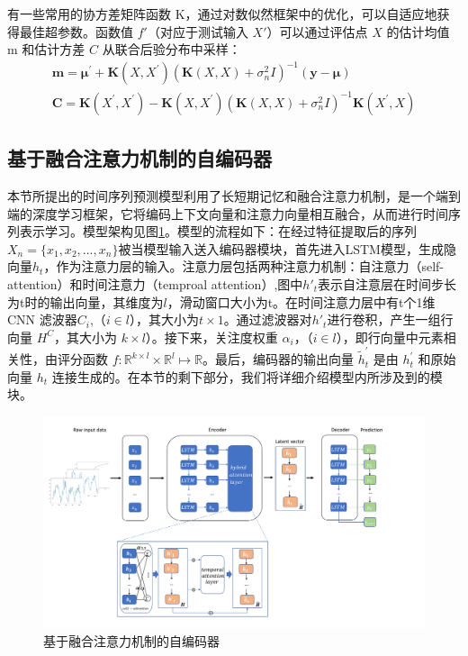 有一些常用的协方差矩阵函数 K，通过对数似然框架中的优化，可以自适应地获得最佳超参数。函数值 $f'$（对应于测试输入 $X'$）可以通过评估点 $X$ 的估计均值 m 和估计方差 $C$ 从联合后验分布中采样：
\begin{equation}
\begin{array}{c}
\boldsymbol{m}=\boldsymbol{\mu}^{\prime}+\boldsymbol{K}\left(X, X^{\prime}\right)\left(\boldsymbol{K}(X, X)+\sigma_{n}^{2} I\right)^{-1}(\boldsymbol{y}-\boldsymbol{\mu}) \\
\boldsymbol{C}=\boldsymbol{K}\left(X^{\prime}, X^{\prime}\right)-\boldsymbol{K}\left(X, X^{\prime}\right)\left(\boldsymbol{K}(X, X)+\sigma_{n}^{2} I\right)^{-1} \boldsymbol{K}\left(X^{\prime}, X\right)
\end{array}
\end{equation}

\subsection{基于融合注意力机制的自编码器}
本节所提出的时间序列预测模型利用了长短期记忆和融合注意力机制，是一个端到端的深度学习框架，它将编码上下文向量和注意力向量相互融合，从而进行时间序列表示学习。模型架构见图\ref{fig4_2}。模型的流程如下：在经过特征提取后的序列$X_{n}=\{x_{1}, x_{2}, ... ,x_{n}\}$被当模型输入送入编码器模块，首先进入LSTM模型，生成隐向量$h_{t}$，作为注意力层的输入。注意力层包括两种注意力机制：自注意力（self-attention）和时间注意力（temproal attention）,图中$h'_{t}$表示自注意层在时间步长为t时的输出向量，其维度为$l$，滑动窗口大小为t。在时间注意力层中有t个1维 CNN 滤波器$C_{i}$,（$i \in l$），其大小为$t\times 1$。通过滤波器对$h'_{t}$进行卷积，产生一组行向量 $H^{C}$，其大小为 $k \times l$）。接下来，关注度权重 $\alpha_{i}$，（$i \in l$），即行向量中元素相关性，由评分函数 $f: \mathbb{R}^{k \times l} \times \mathbb{R}^{l}\mapsto \mathbb{R}$。最后，编码器的输出向量 $\tilde{h}^{'}_{t}$ 是由 $h^{'}_{t}$ 和原始向量 $h_{t}$ 连接生成的。在本节的剩下部分，我们将详细介绍模型内所涉及到的模块。

\begin{figure}[ht]
\begin{center}
\includegraphics[scale=0.4]{./ch4/fig4_2.pdf}
\caption{基于融合注意力机制的自编码器} \label{fig4_2}
\end{center}
\end{figure}

